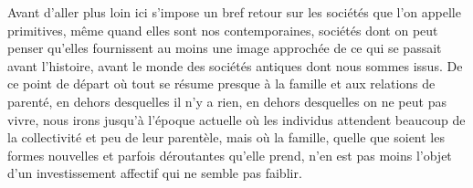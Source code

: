 Avant d'aller plus loin ici s'impose un bref retour sur les sociétés
que l'on appelle primitives, même quand elles sont nos contemporaines,
sociétés dont on peut penser qu'elles fournissent au moins une image
approchée de ce qui se passait avant l'histoire, avant le monde des sociétés antiques dont
nous sommes issus. De ce point de départ où tout se résume presque à la
famille et aux relations de parenté, en dehors desquelles il n'y a rien, en
dehors desquelles on ne peut pas vivre, nous irons jusqu'à l'époque actuelle
où les individus attendent beaucoup de la collectivité et peu de leur
parentèle, mais où la famille, quelle que soient les formes nouvelles et parfois déroutantes
qu'elle prend, n'en est pas moins l'objet d'un investissement affectif qui
ne semble pas faiblir.

